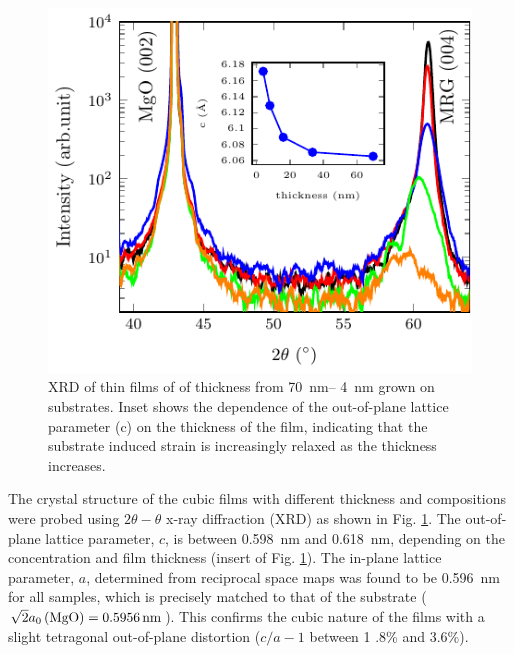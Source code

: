 \documentclass[reprint,aip,apl,floatfix,linenumbers,superscriptaddress]{revtex4-1}
\begin{document}
\begin{figure}
\includegraphics[width=1.0\columnwidth]{Transport-Fig0.pdf}
\caption{XRD of thin films of  of thickness from \SIrange{70}{
4}{\nano\metre} grown on  substrates. Inset shows the dependence of 
the out-of-plane lattice parameter (c) on the thickness of the film, 
indicating that the substrate induced strain is increasingly relaxed as the 
thickness increases.}
\label{fig:xrd}
\end{figure}

The crystal structure of the cubic  films with different thickness 
and compositions were probed using $2\theta-\theta$ x-ray diffraction (XRD) 
as shown in Fig. \ref{fig:xrd}. The out-of-plane lattice parameter, $c$, is 
between \SI{0.598}{\nano\metre} and \SI{0.618}{\nano\metre}, depending on the 
 concentration and film thickness (insert of Fig. \ref{fig:xrd}). The 
in-plane lattice parameter, $a$, determined from reciprocal space maps was 
found to be \SI{0.596}{\nano\metre} for all samples, which is precisely 
matched to that of the  substrate ($\sqrt{2} a_0\left(\ce{MgO} \right)
 = \SI{0.5956}{\nano\metre}$). This confirms the cubic nature of the  
films with a slight tetragonal out-of-plane distortion ($c/a-1$ between \num{1
.8}\% and \num{3.6}\%).
\end{document}
